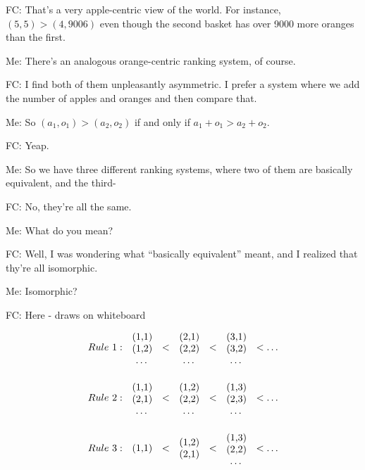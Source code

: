 \documentclass[a4paper,12pt]{article}
\begin{document}
FC: That's a very apple-centric view of the world. For instance, $(5,5) > (4,9006)$ even though the second basket has over 9000 more oranges than the first.

Me: There's an analogous orange-centric ranking system, of course.

FC: I find both of them unpleasantly asymmetric. I prefer a system where we add the number of apples and oranges and then compare that.

Me: So $(a_1, o_1) > (a_2, o_2)$ if and only if $a_1 + o_1 > a_2 + o_2$.

FC: Yeap.

Me: So we have three different ranking systems, where two of them are basically equivalent, and the third-

FC: No, they're all the same.

Me: What do you mean?

FC: Well, I was wondering what ``basically equivalent'' meant, and I realized that thy're all isomorphic.

Me: Isomorphic?

FC: Here - draws on whiteboard

\begin{align*}
Rule\ 1&: \parbox[c]{0.1\textwidth}{\centering (1,1) \\ (1,2) \\ \ldots} < \parbox[c]{0.1\textwidth}{\centering (2,1) \\ (2,2) \\ \ldots} < \parbox[c]{0.1\textwidth}{\centering (3,1) \\ (3,2) \\ \ldots} < \ldots \\ \\
Rule\ 2&: \parbox[c]{0.1\textwidth}{\centering (1,1) \\ (2,1) \\ \ldots} < \parbox[c]{0.1\textwidth}{\centering (1,2) \\ (2,2) \\ \ldots} < \parbox[c]{0.1\textwidth}{\centering (1,3) \\ (2,3) \\ \ldots} < \ldots \\ \\
Rule\ 3&: \parbox[c]{0.1\textwidth}{\centering (1,1)} < \parbox[c]{0.1\textwidth}{\centering (1,2) \\ (2,1)} < \parbox[c]{0.1\textwidth}{\centering (1,3) \\ (2,2) \\ \ldots} < \ldots \\
\end{align*}
\end{document}
